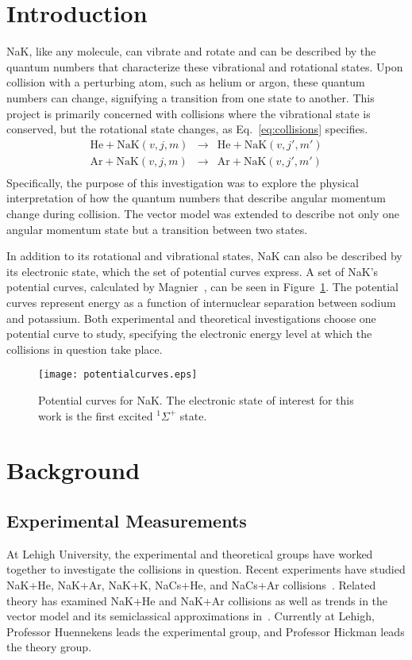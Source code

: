 \documentclass[letterpaper,11pt]{article}
\begin{document}
\clearpage
\tableofcontents
\clearpage
\section{Introduction}
NaK, like any molecule, can vibrate and rotate and can be described by the
quantum numbers that characterize these vibrational and rotational states.
Upon collision with a perturbing atom, such as helium or argon, these quantum
numbers can change, signifying a transition from one state to another.  This
project is primarily concerned with collisions where the vibrational state is
conserved, but the rotational state changes, as Eq.~\ref{eq:collisions}
specifies.  
\begin{eqnarray}
    \mathrm{He}+\mathrm{NaK}(v,j,m)&\rightarrow& \mathrm{He}+\mathrm{NaK}(v,j',m') \nonumber\\
    \mathrm{Ar}+\mathrm{NaK}(v,j,m)&\rightarrow& \mathrm{Ar}+\mathrm{NaK}(v,j',m') \nonumber\\
    \label{eq:collisions}
\end{eqnarray}
Specifically, the purpose of this investigation was to explore the physical
interpretation of how the quantum numbers that describe angular momentum
change during collision.  The vector model was extended to describe not only
one angular momentum state but a transition between two states.

In addition to its rotational and vibrational states, NaK can also be described
by its electronic state, which the set of potential curves express. A set of
NaK's potential curves, calculated by Magnier~\cite{Mag00}, can be seen in
Figure~\ref{fig:potentialcurves}. The potential curves represent energy as a
function of internuclear separation between sodium and potassium. Both
experimental and theoretical investigations choose one potential curve to
study, specifying the electronic energy level at which the collisions in
question take place.
\begin{figure}[ht]
    \centering
    \texttt{[image: potentialcurves.eps]}
    \caption{Potential curves for NaK. The electronic state of interest for this work is the first excited $^1\Sigma^+$ state.}
\label{fig:potentialcurves}
\end{figure}

\section{Background}
\subsection{Experimental Measurements}
At Lehigh University, the experimental and theoretical groups have worked
together to investigate the collisions in question.  Recent experiments have
studied NaK+He, NaK+Ar, NaK+K, NaCs+He, and NaCs+Ar
collisions~\cite{Jon15,Wol11}.  Related theory has examined NaK+He and NaK+Ar
collisions as well as trends in the vector model and its semiclassical
approximations in~\cite{Mal15,Ale83,Der84}.  Currently at Lehigh, Professor
Huennekens leads the experimental group, and Professor Hickman leads the theory
group.
\end{document}
